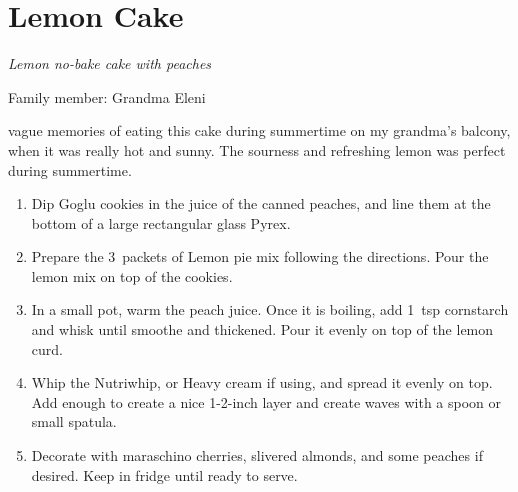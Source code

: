 \chapter{Lemon Cake}
\label{ch:Lemoncake}



\textit{Lemon no-bake cake with peaches}

Family member: Grandma Eleni

 vague memories of eating this cake during summertime on my grandma's balcony, when it was really hot and sunny. The sourness and refreshing lemon was perfect during summertime.

\begin{enumerate}
    \item Dip Goglu cookies in the juice of the canned peaches, and line them at the bottom of a large rectangular glass Pyrex.
    \item Prepare the 3~packets of Lemon pie mix following the directions. Pour the lemon mix on top of the cookies.
    \item In a small pot, warm the peach juice. Once it is boiling, add 1~tsp cornstarch and whisk until smoothe and thickened. Pour it evenly on top of the lemon curd.
    \item Whip the Nutriwhip, or Heavy cream if using, and spread it evenly on top. Add enough to create a nice 1-2-inch layer and create waves with a spoon or small spatula.
    \item Decorate with maraschino cherries, slivered almonds, and some peaches if desired. Keep in fridge until ready to serve.
\end{enumerate}

